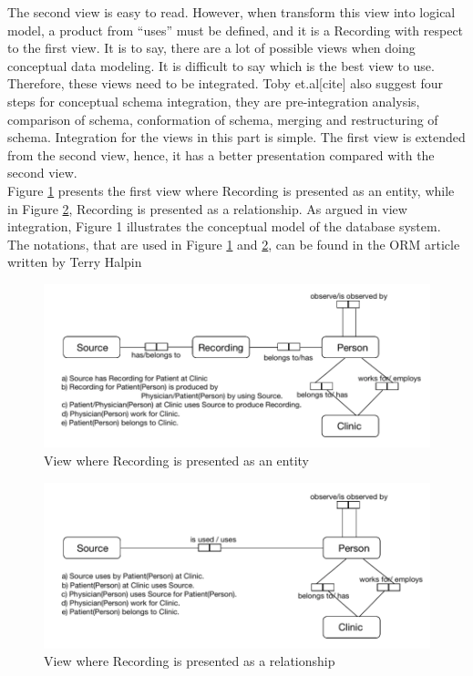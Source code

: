 The second view is easy to read. However, when transform this view into logical model, a product from “uses” must be defined, and it is a Recording with respect to the first view. It is to say, there are a lot of possible views when doing conceptual data modeling. It is difficult to say which is the best view to use. Therefore, these views need to be integrated. Toby et.al[cite] also suggest four steps for conceptual schema integration, they are pre-integration analysis, comparison of schema, conformation of schema, merging and restructuring of schema. Integration for the views in this part is simple. The first view is extended from the second view, hence, it has a better presentation compared with the second view.\\
Figure \ref{fig:Figures/ConceptDB1} presents the first view where Recording is presented as an entity, while in Figure \ref{fig:Figures/ConceptDB2}, Recording is presented as a relationship. As argued in view integration, Figure 1 illustrates the conceptual model of the database system. The notations, that are used in Figure \ref{fig:Figures/ConceptDB1} and \ref{fig:Figures/ConceptDB2}, can be found in the ORM article written by Terry Halpin\cite{ORMdotNET2}
\begin{figure}[ht]
    \centering
    \includegraphics[width=1.0\textwidth]{Figures/ConceptDB1.png}
    \caption{View where Recording is presented as an entity}
    \label{fig:Figures/ConceptDB1}
\end{figure}
\begin{figure}[ht]
    \centering
    \includegraphics[width=1.0\textwidth]{Figures/ConceptDB2.png}
    \caption{View where Recording is presented as a relationship}
    \label{fig:Figures/ConceptDB2}
\end{figure}
